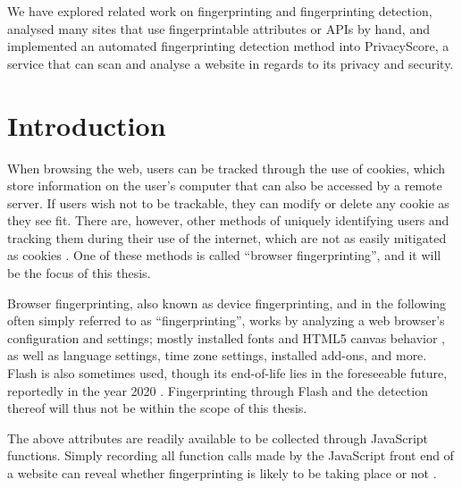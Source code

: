 \documentclass[
    fontsize=12pt,
    headings=small,
    parskip=half,
    bibliography=totoc,
    numbers=noenddot,
    open=any
    ]{scrreprt}
\begin{document}
We have explored related work on fingerprinting and fingerprinting detection,
analysed many sites that use fingerprintable attributes or APIs by hand,
and implemented an automated fingerprinting detection method into PrivacyScore,
a service that can scan and analyse a website in regards to its privacy and security.

\setcounter{tocdepth}{1}
\tableofcontents

\chapter{Introduction}
\label{chap:introduction}

When browsing the web, users can be tracked through the use of cookies, which store information on the user's computer
that can also be accessed by a remote server.
If users wish not to be trackable, they can modify or delete any cookie as they see fit.
There are, however, other methods of uniquely identifying users and tracking them during their use of the internet,
which are not as easily mitigated as cookies \cite{am_i_unique}. One of these methods is called ``browser fingerprinting'',
and it will be the focus of this thesis.

Browser fingerprinting, also known as device fingerprinting, and in the following often simply referred to as ``fingerprinting'',
works by analyzing a web browser's configuration and settings; mostly installed fonts and HTML5 canvas behavior
\cite{DBLP:conf/ccs/EnglehardtN16}, as well as
language settings, time zone settings, installed add-ons, and more. Flash is also sometimes used, though
its end-of-life lies in the foreseeable future, reportedly in the year
2020 \cite{flash_eol}.
Fingerprinting through Flash and the detection thereof will thus not be within the scope of this thesis.

The above attributes are readily available to be collected through JavaScript functions. Simply recording
all function calls made by the JavaScript front end of a website can reveal whether fingerprinting is likely to
be taking place or not \cite{faiz2014browser, panopticlick}.
\end{document}
